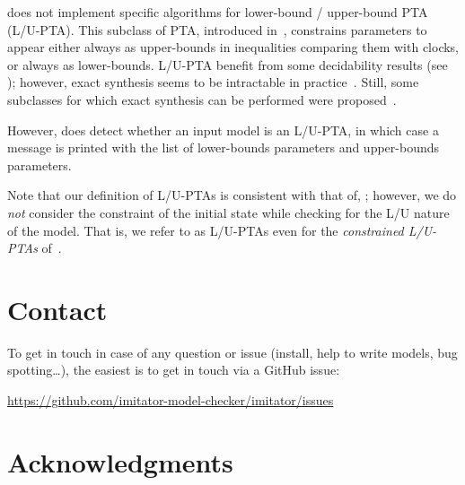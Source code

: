 \imitator{} does not implement specific algorithms for lower-bound / upper-bound PTA (L/U-PTA).
This subclass of PTA, introduced in~\cite{HRSV02}, constrains parameters to appear either always as upper-bounds in inequalities comparing them with clocks, or always as lower-bounds.
L/U-PTA benefit from some decidability results (see \eg{} \cite{HRSV02,BlT09,JLR15,ALime17,ALM20}); however, exact synthesis seems to be intractable in practice~\cite{JLR15,ALR16ICFEM}.
Still, some subclasses for which exact synthesis can be performed were proposed~\cite{BlT09,ALR18FORMATS}.

However, \imitator{} does detect whether an input model is an L/U-PTA, in which case a message is printed with the list of lower-bounds parameters and upper-bounds parameters.

\begin{remark}
	Note that our definition of L/U-PTAs is consistent with that of, \eg{} \cite{BlT09}; however, we do \emph{not} consider the constraint of the initial state while checking for the L/U nature of the model.
	That is, we refer to as L/U-PTAs even for the \emph{constrained L/U-PTAs} of~\cite{BlT09}.
\end{remark}


\chapter{Contact}\label{chapter:contact}

To get in touch in case of any question or issue (install, help to write models, bug spotting…), the easiest is to get in touch via a GitHub issue:

\url{https://github.com/imitator-model-checker/imitator/issues}


\chapter{Acknowledgments}

